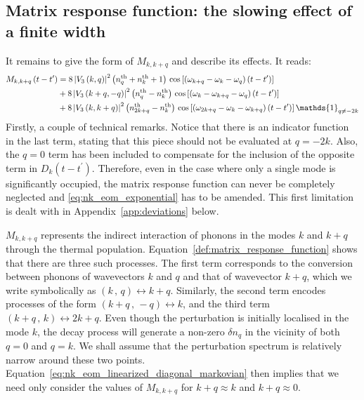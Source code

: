 \documentclass[aps,prd,notitlepage,amsfonts,amssymb,amsmath,nofootinbib,superscriptaddress,longbibliography]{revtex4-2}
\begin{document}
\begin{appendices}
\subsection{Matrix response function: the slowing effect of a finite width}

It remains to give the form of $M_{k,k+q}$ and describe its effects. It reads:
\begin{align}
\begin{split}
\label{def:matrix_response_function}
M_{k,k+q}\left(t-t^{\prime}\right) & = 8 \left|V_{3}\left(k,q\right)\right|^{2} \left( n_{q}^{\rm th} + n_{k}^{\rm th} + 1 \right) \, {\rm cos}\left[\left(\omega_{k+q}-\omega_{k}-\omega_{q}\right)\left(t-t^{\prime}\right)\right] \\ 
& + 8 \left|V_{3}\left(k+q,-q\right)\right|^{2} \left( n_{q}^{\rm th} - n_{k}^{\rm th} \right) \, {\rm cos}\left[\left(\omega_{k}-\omega_{k+q}-\omega_{q}\right)\left(t-t^{\prime}\right)\right] \\
& + 8 \left|V_{3}\left(k,k+q\right)\right|^{2} \left( n_{2k+q}^{\rm th} - n_{k}^{\rm th} \right) \, {\rm cos}\left[\left(\omega_{2k+q}-\omega_{k}-\omega_{k+q}\right)\left(t-t^{\prime}\right)\right] \mathds{1}_{q \neq -2k}
\end{split}
\end{align}
Firstly, a couple of technical remarks. Notice that there is an indicator function in the last term, stating that this piece should not be evaluated at $q = -2k$.  Also, the $q=0$ term has been included to compensate for the inclusion of the opposite term in $D_{k}\left(t-t^{\prime}\right)$. Therefore, even in the case where only a single mode is significantly occupied, the matrix response function can never be completely neglected and \eqref{eq:nk_eom_exponential} has to be amended.  This first limitation is dealt with in Appendix~\ref{app:deviations} below.


$M_{k,k+q}$ represents the indirect interaction of phonons in the modes $k$ and $k+q$ through the thermal population. Equation~\eqref{def:matrix_response_function} shows that there are three such processes. The first term corresponds to the conversion between phonons of wavevectors $k$ and $q$ and that of wavevector $k+q$, which we write symbolically as $\left(k \,,\, q\right) \leftrightarrow k+q$. Similarly, the second term encodes processes of the form $\left(k+q \,,\, -q\right) \leftrightarrow k$, and the third term $\left(k+q \,,\, k\right) \leftrightarrow 2k+q$. Even though the perturbation is initially localised in the mode $k$, the decay process will generate a non-zero $\delta n_q$ in the vicinity of both $q=0$ and $q=k$. We shall assume that the perturbation spectrum is relatively narrow around these two points. Equation~\eqref{eq:nk_eom_linearized_diagonal_markovian} then implies that we need only consider the values of $M_{k,k+q}$ for $k + q \approx k$ and $k + q\approx 0$. 


\end{appendices}
\end{document}
